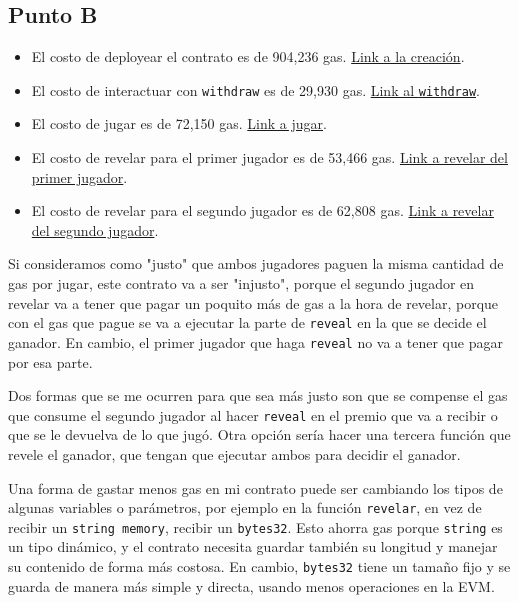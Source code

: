\documentclass[12pt]{article}
\begin{document}
\subsection*{Punto B}
\begin{itemize}
    \item El costo de deployear el contrato es de 904,236 gas. \href{https://sepolia.etherscan.io/tx/0xada5c14a0889e3d5cbb4d5b3b86e3e98e126095b995e538e33109778e51f670c}{Link a la creación}.
    
    \item El costo de interactuar con \texttt{withdraw} es de 29,930 gas. \href{https://sepolia.etherscan.io/tx/0xd9e2097eb704afd6eafb454ca006b86f11eb5ff2cea64eacea869429b6ff8223}{Link al \texttt{withdraw}}.
    
    \item El costo de jugar es de 72,150 gas. \href{https://sepolia.etherscan.io/tx/0xb953eca99800ea9558a27d120fd7a1755cec04efb99100e38da9d5e659dc571c}{Link a jugar}.
    
    \item El costo de revelar para el primer jugador es de 53,466 gas. \href{https://sepolia.etherscan.io/tx/0x07437d0462c71bd80d5774399a499576efcee9750f058ca6dd6e55115b84d9eb}{Link a revelar del primer jugador}.
    
    \item El costo de revelar para el segundo jugador es de 62,808 gas. \href{https://sepolia.etherscan.io/tx/0xb953eca99800ea9558a27d120fd7a1755cec04efb99100e38da9d5e659dc571c}{Link a revelar del segundo jugador}.
\end{itemize}



Si consideramos como "justo" que ambos jugadores paguen la misma cantidad de gas por jugar, este contrato va a ser "injusto", porque el segundo jugador en revelar va a tener que pagar un poquito más de gas a la hora de revelar, porque con el gas que pague se va a ejecutar la parte de \texttt{reveal} en la que se decide el ganador. En cambio, el primer jugador que haga \texttt{reveal} no va a tener que pagar por esa parte. 

Dos formas que se me ocurren para que sea más justo son que se compense el gas que consume el segundo jugador al hacer \texttt{reveal} en el premio que va a recibir o que se le devuelva de lo que jugó. Otra opción sería hacer una tercera función que revele el ganador, que tengan que ejecutar ambos para decidir el ganador. 

Una forma de gastar menos gas en mi contrato puede ser cambiando los tipos de algunas variables o parámetros, por ejemplo en la función \texttt{revelar}, 
en vez de recibir un \texttt{string memory}, recibir un \texttt{bytes32}. Esto ahorra gas porque \texttt{string} es un tipo dinámico, y el contrato necesita guardar también su longitud y manejar su contenido de forma más costosa. 
En cambio, \texttt{bytes32} tiene un tamaño fijo y se guarda de manera más simple y directa, usando menos operaciones en la EVM.
\end{document}
